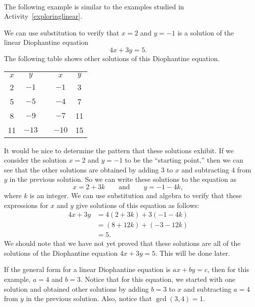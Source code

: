 \begin{example} \label{E:lineardioph} \hfill \\
The following  example is similar to the examples studied in 
\typeu Activity~\ref*{exploringlinear}.

We can use substitution to verify that $x = 2$ and $y = -1$ is a solution of the linear Diophantine equation
\[
4x + 3y = 5.
\]
The following table shows other solutions of this Diophantine equation.
\begin{center}
\begin{tabular}{c | c  c c | c}
$x$  &  $y$  &  &  $x$  &  $y$ \\ \cline{1-2} \cline{4-5}
2  &  $-1$ &  &  $-1$ &  3 \\
5  &  $-5$ &  &  $-4$ &  7 \\
8  &  $-9$ &  &  $-7$ & 11 \\
11 &  $-13$ &  & $-10$ & 15 \\
\end{tabular}
\end{center}
It would be nice to determine the pattern that these solutions exhibit.  If we consider the solution $x = 2$ and $y =-1$ to be the ``starting point,'' then we can see that the other solutions are obtained by adding 3 to $x$ and subtracting 4 from $y$ in the previous solution.  So we can write these solutions to the equation as
\[
x = 2 + 3k \qquad \text{and} \qquad y = -1 - 4k, 
\]
where $k$ is an integer.  We can use substitution and algebra to verify that these expressions for $x$ and $y$ give solutions of this equation as follows:
\begin{align*}
4x + 3y &= 4 \left( 2+3k \right) + 3 \left( -1-4k \right) \\
        &= \left( 8 + 12k \right) + \left( -3 - 12k \right) \\
        &= 5.
\end{align*}
We should note that we have not yet proved that these solutions are all of the solutions of the Diophantine equation $4x + 3y = 5$.  This will be done later.

If the general form for a linear Diophantine equation is $ax + by = c$, then for this example, 
$a = 4$ and $b = 3$.  Notice that for this equation, we started with one solution and obtained other solutions by adding $b = 3$ to $x$ and subtracting $a = 4$ from $y$ in the previous solution.  Also, notice that $\gcd( 3, 4 ) = 1$.
\end{example}
\hbreak

